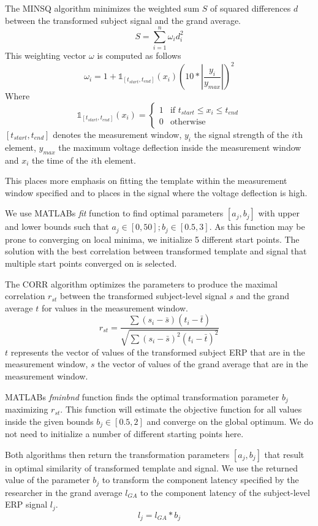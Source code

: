 \documentclass[
  man,floatsintext]{apa7}
\begin{document}
The MINSQ algorithm minimizes the weighted sum \(S\) of squared differences \(d\) between the transformed subject signal and the grand average.
\[S = \sum_{i = 1}^{n}\omega_{i}d_{i}^2\]
This weighting vector \(\omega\) is computed as follows
\[\omega_i = 1+\mathbb{1}_{[t_{start}, t_{end}]}(x_i)(10 * |\frac{y_i}{y_{max}}|)^2\]
Where
\[\mathbb{1}_{[t_{start}, t_{end}]}(x_i) = \begin{cases} 1 & \text{if $t_{start} \le x_i \le t_{end}$} \\ 0 & \text{otherwise}\end{cases}\]\([t_{start}, t_{end}]\) denotes the measurement window, \(y_{i}\) the signal strength of the \(i\)th element, \(y_{max}\) the maximum voltage deflection inside the measurement window and \(x_i\) the time of the \(i\)th element.

This places more emphasis on fitting the template within the measurement window specified and to places in the signal where the voltage deflection is high.

We use MATLABs \emph{fit} function to find optimal parameters \([a_j, b_j]\) with upper and lower bounds such that \(a_j \in [0, 50]; b_j \in [0.5, 3]\). As this function may be prone to converging on local minima, we initialize 5 different start points. The solution with the best correlation between transformed template and signal that multiple start points converged on is selected.

The CORR algorithm optimizes the parameters to produce the maximal correlation \(r_{st}\) between the transformed subject-level signal \(s\) and the grand average \(t\) for values in the measurement window.
\[r_{st} = \frac{\sum(s_i - \bar{s})(t_{i} - \bar{t})}{\sqrt{\sum(s_i - \bar{s})^2(t_{i} - \bar{t})^2}}\]
\(t\) represents the vector of values of the transformed subject ERP that are in the measurement window, \(s\) the vector of values of the grand average that are in the measurement window.

MATLABs \emph{fminbnd} function finds the optimal transformation parameter \(b_j\) maximizing \(r_{st}\). This function will estimate the objective function for all values inside the given bounds \(b_j \in [0.5, 2]\) and converge on the global optimum. We do not need to initialize a number of different starting points here.

Both algorithms then return the transformation parameters \([a_j, b_j]\) that result in optimal similarity of transformed template and signal. We use the returned value of the parameter \(b_j\) to transform the component latency specified by the researcher in the grand average \(l_{GA}\) to the component latency of the subject-level ERP signal \(l_j\).
\[ l_j = l_{GA} * b_j \]
\end{document}

